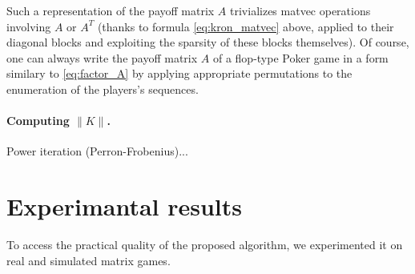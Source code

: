 \documentclass[envcountsame]{llcns2e/llncs}
\begin{document}
Such a representation of the payoff matrix $A$ trivializes matvec
operations involving $A$ or $A^T$ (thanks to formula
\eqref{eq:kron_matvec} above, applied to their diagonal blocks and
exploiting the sparsity of these blocks themselves). Of course, one
can always write the payoff matrix $A$ of a flop-type Poker game in a
form similary to \eqref{eq:factor_A} by applying appropriate
permutations to the enumeration of the players's sequences.

\paragraph{\textbf{Computing $\|K\|$.}} Power iteration (Perron-Frobenius)...

\section{Experimantal results}
\label{sec:results}
To access the practical quality of the proposed algorithm, we
experimented it on real and simulated matrix games.
\end{document}
